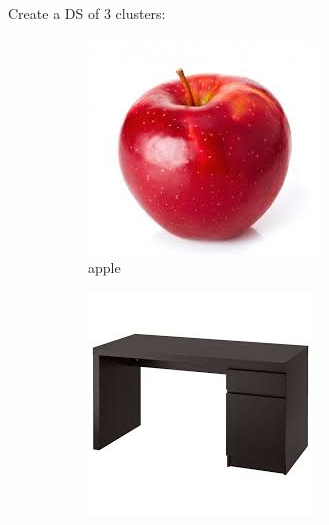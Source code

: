 \documentclass{homework}
\begin{document}
Create a DS of 3 clusters:
\begin{figure}[hbt!]
     \centering
     \begin{subfigure}[b]{0.2\textwidth}
         \centering
         \includegraphics[width=\textwidth]{apple.png}
         \caption{apple}
     \end{subfigure}
     \hfill
     \begin{subfigure}[b]{0.2\textwidth}
         \centering
         \includegraphics[width=\textwidth]{desk.png}

\end{subfigure}
\end{figure}
\end{document}
